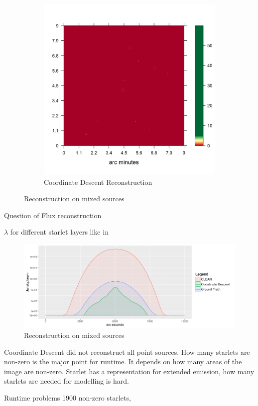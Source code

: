 \begin{figure}[h]
\begin{subfigure}[b]{0.4\linewidth}
		\includegraphics[width=\linewidth, trim={0.2in, 0.2in, 0, 0.2in}, clip]{./chapters/20.results/mixed/mixed_cd.png}
		\caption{Coordinate Descent Reconstruction}
		\label{results:mixed:cd}
	\end{subfigure}
	\caption{Reconstruction on mixed sources}
	\label{results:mixed}
\end{figure}

Question of Flux reconstruction

 $\lambda$ for different starlet layers like in \cite{girard2015sparse}

\begin{figure}[h]
	\centering
	\includegraphics[width=0.8\linewidth]{./chapters/20.results/mixed/mixed_cut0.png}
	\caption{Reconstruction on mixed sources}
	\label{results:mixed:contour}
\end{figure}

Coordinate Descent did not reconstruct all point sources. How many starlets are non-zero is the major point for runtime. It depends on how many areas of the image are non-zero. Starlet has a representation for extended emission, how many starlets are needed for modelling is hard.

Runtime problems
1900 non-zero starlets, 


